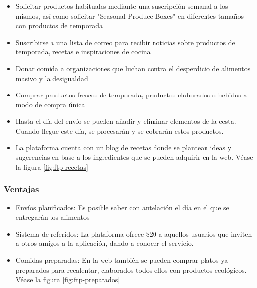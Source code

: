 \begin{itemize}

	\item Solicitar productos habituales mediante una suscripción semanal a los mismos, así como solicitar "Seasonal Produce Boxes"{} en diferentes tamaños con productos de temporada

	\item Suscribirse a una lista de correo para recibir noticias sobre productos de temporada, recetas e inspiraciones de cocina

	\item Donar comida a organizaciones que luchan contra el desperdicio de alimentos masivo y la desigualdad

	\item Comprar productos frescos de temporada, productos elaborados o bebidas a modo de compra única

	\item Hasta el día del envío se pueden añadir y eliminar elementos de la cesta. Cuando llegue este día, se procesarán y se cobrarán estos productos.

	\item La plataforma cuenta con un blog de recetas donde se plantean ideas y sugerencias en base a los ingredientes que se pueden adquirir en la web. Véase la figura \ref{fig:ftp-recetas}

\end{itemize}


\subsubsection{Ventajas}

\begin{itemize}

	\item Envíos planificados: Es posible saber con antelación el día en el que se entregarán los alimentos

	\item Sistema de referidos: La plataforma ofrece \$20 a aquellos usuarios que inviten a otros amigos a la aplicación, dando a conocer el servicio.

	\item Comidas preparadas: En la web también se pueden comprar platos ya preparados para recalentar, elaborados todos ellos con productos ecológicos. Véase la figura \ref{fig:ftp-preparados}

\end{itemize}

